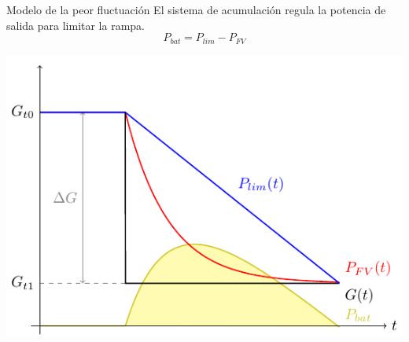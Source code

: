 \documentclass[aspectratio=169, usenames,svgnames,dvipsnames]{beamer}
\begin{document}
\begin{frame}[label={sec:org07cc1bf}]{Modelo de la peor fluctuación}
El sistema de acumulación regula la potencia de salida para limitar la rampa. 
\[
  P_{bat} = P_{lim} - P_{FV}
\]

\begin{center}
\includegraphics[height=0.75\textheight]{../figs/ModeloPeorFluctuacion.pdf}
\end{center}
\end{frame}
\end{document}
